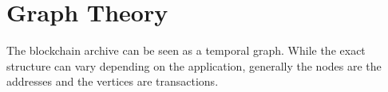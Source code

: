 \section{Graph Theory} \label{sec:hybrid-graph}

The blockchain archive can be seen as a temporal graph.
While the exact structure can vary depending on the application, generally the nodes are the addresses and the vertices are transactions.
